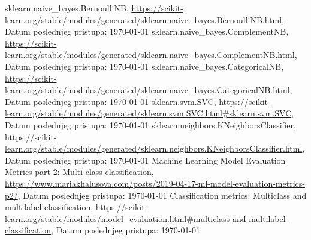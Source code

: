 \documentclass[fontsize=12bp, paper=a4]{scrarticle}
\begin{document}
\begin{thebibliography}{1}
    sklearn.naive\_bayes.BernoulliNB, \url{https://scikit-learn.org/stable/modules/generated/sklearn.naive\_bayes.BernoulliNB.html}, Datum poslednjeg pristupa: \today
    sklearn.naive\_bayes.ComplementNB, \url{https://scikit-learn.org/stable/modules/generated/sklearn.naive\_bayes.ComplementNB.html}, Datum poslednjeg pristupa: \today
    sklearn.naive\_bayes.CategoricalNB, \url{https://scikit-learn.org/stable/modules/generated/sklearn.naive\_bayes.CategoricalNB.html}, Datum poslednjeg pristupa: \today
    sklearn.svm.SVC, \url{https://scikit-learn.org/stable/modules/generated/sklearn.svm.SVC.html#sklearn.svm.SVC}, Datum poslednjeg pristupa: \today
    sklearn.neighbors.KNeighborsClassifier, \url{https://scikit-learn.org/stable/modules/generated/sklearn.neighbors.KNeighborsClassifier.html}, Datum poslednjeg pristupa: \today
    Machine Learning Model Evaluation Metrics part 2: Multi-class classification, \url{https://www.mariakhalusova.com/posts/2019-04-17-ml-model-evaluation-metrics-p2/}, Datum poslednjeg pristupa: \today
    Classification metrics: Multiclass and multilabel classification, \url{https://scikit-learn.org/stable/modules/model_evaluation.html#multiclass-and-multilabel-classification}, Datum poslednjeg pristupa: \today
\end{thebibliography}






\end{document}
